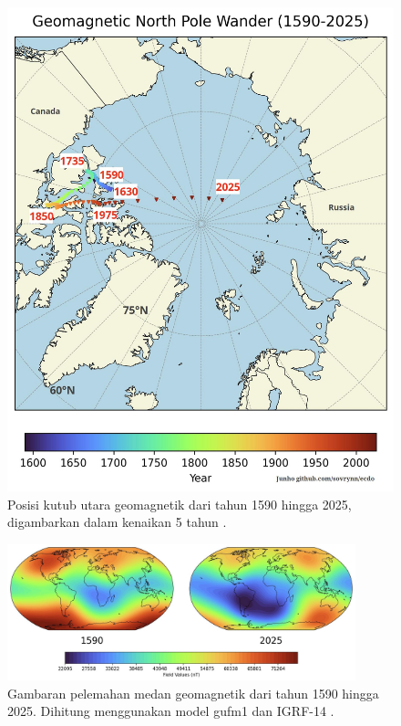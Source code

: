 \documentclass[10pt,twocolumn,letterpaper]{article}
\begin{document}
\begin{figure}[t]
\begin{center}
   \includegraphics[width=1\linewidth]{npw.jpg}
\end{center}
   \caption{Posisi kutub utara geomagnetik dari tahun 1590 hingga 2025, digambarkan dalam kenaikan 5 tahun \cite{142}.}
\label{fig:13}
\label{fig:onecol}
\end{figure}

\begin{figure}[t]
\begin{center}
\includegraphics[width=0.9\textwidth]{saa.jpg}
\end{center}
   \caption{Gambaran pelemahan medan geomagnetik dari tahun 1590 hingga 2025. Dihitung menggunakan model gufm1 dan IGRF-14 \cite{125,126}.}
\label{fig:14}
\end{figure}
\end{document}
